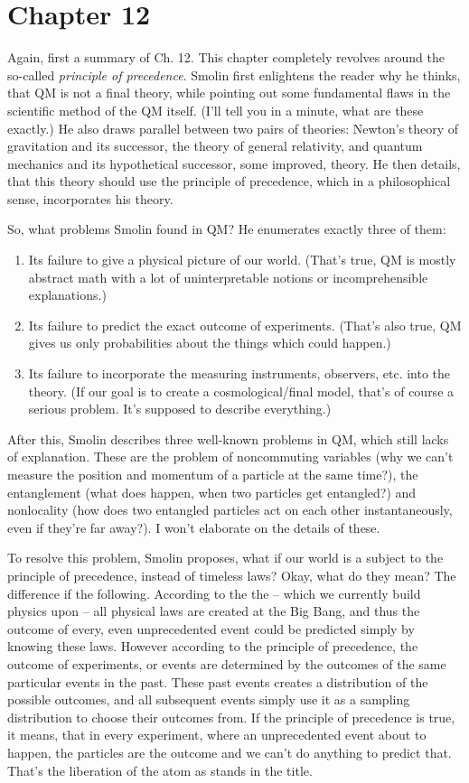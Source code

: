 \section{Chapter 12}
Again, first a summary of Ch. 12. This chapter completely revolves around the so-called \textit{principle of precedence}. Smolin first enlightens the reader why he thinks, that QM is not a final theory, while pointing out some fundamental flaws in the scientific method of the QM itself. (I'll tell you in a minute, what are these exactly.) He also draws parallel between two pairs of theories: Newton's theory of gravitation and its successor, the theory of general relativity, and quantum mechanics and its hypothetical successor, some improved,  theory. He then details, that this theory should use the principle of precedence, which in a philosophical sense, incorporates his  theory. \par
So, what problems Smolin found in QM? He enumerates exactly three of them:
\begin{enumerate}
	\item Its failure to give a physical picture of our world. (That's true, QM is mostly abstract math with a lot of uninterpretable notions or incomprehensible explanations.)
	\item Its failure to predict the exact outcome of experiments. (That's also true, QM gives us only probabilities about the things which could happen.)
	\item Its failure to incorporate the measuring instruments, observers, etc. into the theory. (If our goal is to create a cosmological/final model, that's of course a serious problem. It's supposed to describe everything.)
\end{enumerate}
After this, Smolin describes three well-known problems in QM, which still lacks of explanation. These are the problem of noncommuting variables (why we can't measure the position and momentum of a particle at the same time?), the entanglement (what does happen, when two particles get entangled?) and nonlocality (how does two entangled particles act on each other instantaneously, even if they're far away?). I won't elaborate on the details of these. \par
To resolve this problem, Smolin proposes, what if our world is a subject to the principle of precedence, instead of timeless laws? Okay, what do they mean? The difference if the following. According to the the  -- which we currently build physics upon -- all physical laws are created at the Big Bang, and thus the outcome of every, even unprecedented event could be predicted simply by knowing these laws. However according to the principle of precedence, the outcome of experiments, or events are determined by the outcomes of the same particular events in the past. These past events creates a distribution of the possible outcomes, and all subsequent events simply use it as a sampling distribution to choose their outcomes from. If the principle of precedence is true, it means, that in every experiment, where an unprecedented event about to happen, the particles are  the outcome and we can't do anything to predict that. That's the liberation of the atom as stands in the title. \par
